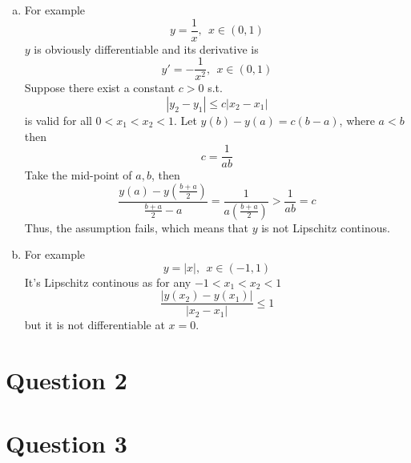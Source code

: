 \documentclass[paper=a4, fontsize=11pt]{scrartcl} %
\numberwithin{equation}{section} %
\numberwithin{figure}{section} %
\numberwithin{table}{section} %
\begin{document}
\begin{enumerate}[(a)]
\begin{proof}
				Thus, from Rolle's theorem, there exists $\xi \in (x_1, x_2)$ s.t. 
				\begin{equation}
					g'(\xi)= 0
				\end{equation}
				namely
				\begin{equation}
					\frac{f(x_2) - f(x_1)}{x_2-x_1} = f'(\xi)
				\end{equation}
				Since $f'$ is bounded, then $|f'(\xi)| \leq M$. Thus
				\begin{equation}
					|f(x_2) - f(x_1)| \leq M |x_2 - x_1|
				\end{equation}
				which means that $f(x)$ is Lipschitz continous.
			\end{proof}
		\item 
			For example
			\begin{equation}
				y = \frac{1}{x}, \ \ x \in (0, 1)
			\end{equation}
			$y$ is obviously differentiable and its derivative is
			\begin{equation}
				y' = -\frac{1}{x^2}, \ \ x \in (0, 1)
			\end{equation}
			Suppose there exist a constant $c>0$ s.t. 
			\begin{equation}
				|y_2 - y_1| \leq c|x_2 - x_1|
			\end{equation}
			is valid for all $0 < x_1 < x_2 < 1$.
			Let $y(b) - y(a) = c(b-a)$, where $a < b$then
			\begin{equation}
				c = \frac{1}{ab}
			\end{equation}
			Take the mid-point of $a, b$, then
			\begin{equation}
				\frac{y(a)-y(\frac{b+a}{2})}{\frac{b+a}{2}-a} = \frac{1}{a(\frac{b+a}{2})} > \frac{1}{ab} = c
			\end{equation}
			Thus, the assumption fails, which means that $y$ is not Lipschitz continous.
		\item 
			For example
			\begin{equation}
				y = |x|, \ \ x \in (-1, 1)
			\end{equation}
			It's Lipschitz continous as for any $-1 < x_1 < x_2 < 1$
			\begin{equation}
				\frac{|y(x_2)-y(x_1)|}{|x_2 - x_1|} \leq 1
			\end{equation}
			but it is not differentiable at $x=0$.
		
	\end{enumerate}

\section{Question 2}
	
\section{Question 3}
\end{document}
